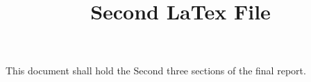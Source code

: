 \documentclass[12pt,A4paper]{article}
\author{}
\date{}
\begin{document}
	\title{Second LaTex File}
	\maketitle
This document shall hold the Second three sections of the final report.
\end{document}
